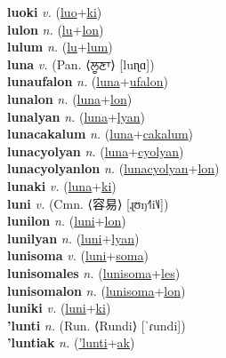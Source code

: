 \textbf{luoki} \textit{v.} (\hyperref[luo]{luo}+\hyperref[ki]{ki})
 \label{luoki} \\
\textbf{lulon} \textit{n.} (\hyperref[lu]{lu}+\hyperref[lon]{lon})
 \label{lulon} \\
\textbf{lulum} \textit{n.} (\hyperref[lu]{lu}+\hyperref[lum]{lum})
 \label{lulum} \\
\textbf{luna} \textit{v.} (Pan. ⟨ਲੂਣਾ⟩ [luɳɑ])
 \label{luna} \\
\textbf{lunaufalon} \textit{n.} (\hyperref[luna]{luna}+\hyperref[ufalon]{ufalon})
 \label{lunaufalon} \\
\textbf{lunalon} \textit{n.} (\hyperref[luna]{luna}+\hyperref[lon]{lon})
 \label{lunalon} \\
\textbf{lunalyan} \textit{n.} (\hyperref[luna]{luna}+\hyperref[lyan]{lyan})
 \label{lunalyan} \\
\textbf{lunacakalum} \textit{n.} (\hyperref[luna]{luna}+\hyperref[cakalum]{cakalum})
 \label{lunacakalum} \\
\textbf{lunacyolyan} \textit{n.} (\hyperref[luna]{luna}+\hyperref[cyolyan]{cyolyan})
 \label{lunacyolyan} \\
\textbf{lunacyolyanlon} \textit{n.} (\hyperref[lunacyolyan]{lunacyolyan}+\hyperref[lon]{lon})
 \label{lunacyolyanlon} \\
\textbf{lunaki} \textit{v.} (\hyperref[luna]{luna}+\hyperref[ki]{ki})
 \label{lunaki} \\
\textbf{luni} \textit{v.} (Cmn. ⟨容易⟩ [ɻʊŋ˧˥i˥˩])
 \label{luni} \\
\textbf{lunilon} \textit{n.} (\hyperref[luni]{luni}+\hyperref[lon]{lon})
 \label{lunilon} \\
\textbf{lunilyan} \textit{n.} (\hyperref[luni]{luni}+\hyperref[lyan]{lyan})
 \label{lunilyan} \\
\textbf{lunisoma} \textit{v.} (\hyperref[luni]{luni}+\hyperref[soma]{soma})
 \label{lunisoma} \\
\textbf{lunisomales} \textit{n.} (\hyperref[lunisoma]{lunisoma}+\hyperref[les]{les})
 \label{lunisomales} \\
\textbf{lunisomalon} \textit{n.} (\hyperref[lunisoma]{lunisoma}+\hyperref[lon]{lon})
 \label{lunisomalon} \\
\textbf{luniki} \textit{v.} (\hyperref[luni]{luni}+\hyperref[ki]{ki})
 \label{luniki} \\
\textbf{'lunti} \textit{n.} (Run. ⟨Rundi⟩ [ˈɾundi])
 \label{'lunti} \\
\textbf{'luntiak} \textit{n.} (\hyperref['lunti]{'lunti}+\hyperref[ak]{ak})
